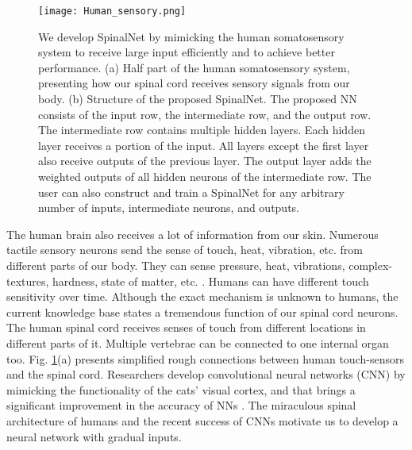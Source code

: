 \documentclass[journal]{IEEEtran}
\begin{document}
\begin{figure}
  \centering
  \texttt{[image: Human\_sensory.png]}
  \caption{ We develop SpinalNet by mimicking the human somatosensory system to receive large input efficiently and to achieve better performance. (a) Half part of the human somatosensory system, presenting how our spinal cord receives sensory signals from our body. (b) Structure of the proposed SpinalNet. The proposed NN consists of the input row, the intermediate row, and the output row. The intermediate row contains multiple hidden layers. Each hidden layer receives a portion of the input. All layers except the first layer also receive outputs of the previous layer. The output layer adds the weighted outputs of all hidden neurons of the intermediate row. The user can also construct and train a SpinalNet for any arbitrary number of inputs, intermediate neurons, and outputs.   }
  \label{Human_SN}
\end{figure}

The human brain also receives a lot of information from our skin. Numerous tactile sensory neurons send the sense of touch, heat, vibration, etc. from different parts of our body. They can sense pressure, heat, vibrations, complex-textures, hardness, state of matter, etc. \cite{okamoto2012psychophysical}. Humans can have different touch sensitivity over time. Although the exact mechanism is unknown to humans, the current knowledge base states a tremendous function of our spinal cord neurons. The human spinal cord receives senses of touch from different locations in different parts of it. Multiple vertebrae can be connected to one internal organ too. Fig. \ref{Human_SN}(a) presents simplified rough connections between human touch-sensors and the spinal cord.  Researchers develop convolutional neural networks (CNN) by mimicking the functionality of the cats' visual cortex, and that brings a significant improvement in the accuracy of NNs \cite{hubel1962receptive}. The miraculous spinal architecture of humans and the recent success of CNNs motivate us to develop a neural network with gradual inputs. 
\end{document}

